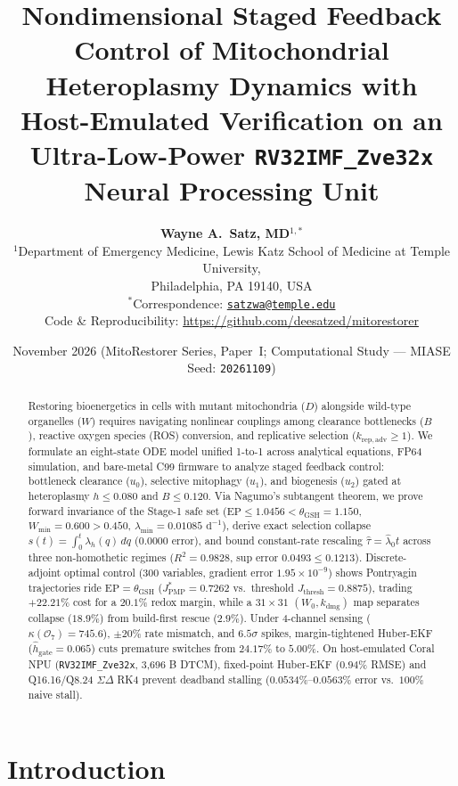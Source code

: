 \documentclass[11pt]{article}
\title{\LARGE\textbf{Nondimensional Staged Feedback Control of Mitochondrial Heteroplasmy Dynamics with Host-Emulated Verification on an Ultra-Low-Power \texttt{RV32IMF\_Zve32x} Neural Processing Unit}}
\author{
  \textbf{Wayne A.~Satz, MD}$^{1,*}$ \\[0.35em]
  {\small $^{1}$Department of Emergency Medicine, Lewis Katz School of Medicine at Temple University,}\\
  {\small Philadelphia, PA 19140, USA} \\[0.25em]
  {\small $^{*}$Correspondence: \href{mailto:satzwa@temple.edu}{\texttt{satzwa@temple.edu}}} \\
  {\small Code \& Reproducibility: \url{https://github.com/deesatzed/mitorestorer}}
}
\date{\small November 2026 \quad (MitoRestorer Series, Paper~I; Computational Study --- MIASE Seed: \texttt{20261109})}
\theoremstyle{plain}
\theoremstyle{remark}
\begin{document}
\maketitle

\begin{abstract}
\noindent Restoring bioenergetics in cells with mutant mitochondria ($D$) alongside wild-type organelles ($W$) requires navigating nonlinear couplings among clearance bottlenecks ($B$), reactive oxygen species (ROS) conversion, and replicative selection ($k_{\mathrm{rep,adv}} \ge 1$). We formulate an eight-state ODE model unified 1-to-1 across analytical equations, FP64 simulation, and bare-metal C99 firmware to analyze staged feedback control: bottleneck clearance ($u_0$), selective mitophagy ($u_1$), and biogenesis ($u_2$) gated at heteroplasmy $h \le 0.080$ and $B \le 0.120$. Via Nagumo's subtangent theorem, we prove forward invariance of the Stage-1 safe set ($\mathrm{EP} \le 1.0456 < \theta_{\mathrm{GSH}} = 1.150$, $W_{\min} = 0.600 > 0.450$, $\lambda_{\min} = 0.01085\text{ d}^{-1}$), derive exact selection collapse $s(t) = \int_0^t \lambda_h(q)\,dq$ ($0.0000$ error), and bound constant-rate rescaling $\hat{\tau} = \hat{\lambda}_0 t$ across three non-homothetic regimes ($R^2 = 0.9828$, sup error $0.0493 \le 0.1213$). Discrete-adjoint optimal control (300 variables, gradient error $1.95 \times 10^{-9}$) shows Pontryagin trajectories ride $\mathrm{EP} = \theta_{\mathrm{GSH}}$ ($J_{\mathrm{PMP}}^* = 0.7262$ vs.\ threshold $J_{\mathrm{thresh}} = 0.8875$), trading $+22.21\%$ cost for a $20.1\%$ redox margin, while a $31 \times 31$ $(W_0, k_{\mathrm{dmg}})$ map separates collapse ($18.9\%$) from build-first rescue ($2.9\%$). Under 4-channel sensing ($\kappa(\mathcal{O}_7) = 745.6$), $\pm 20\%$ rate mismatch, and $6.5\sigma$ spikes, margin-tightened Huber-EKF ($\hat{h}_{\mathrm{gate}} = 0.065$) cuts premature switches from $24.17\%$ to $5.00\%$. On host-emulated Coral NPU (\texttt{RV32IMF\_Zve32x}, 3,696 B DTCM), fixed-point Huber-EKF ($0.94\%$ RMSE) and Q16.16/Q8.24 $\Sigma\Delta$ RK4 prevent deadband stalling ($0.0534\%$--$0.0563\%$ error vs.\ $100\%$ naive stall).
\end{abstract}

\section{Introduction}
\end{document}

